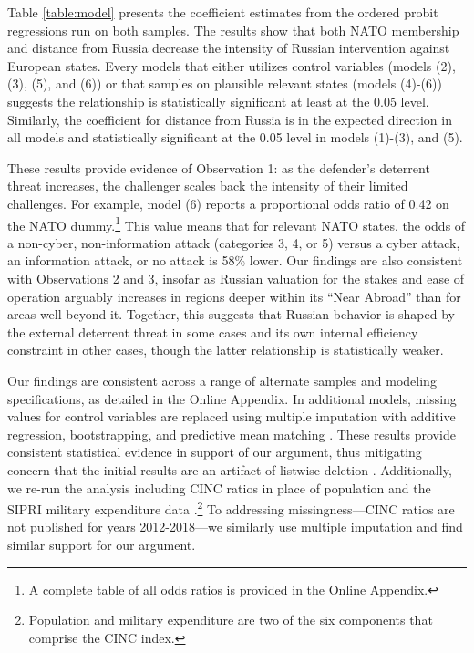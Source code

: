 \documentclass[bibtex, autowc]{apsr_submission}
\begin{document}


Table \ref{table:model} presents the coefficient estimates from the ordered probit regressions run on both samples. The results show that both NATO membership and distance from Russia decrease the intensity of Russian intervention against European states. Every models that either utilizes control variables (models (2), (3), (5), and (6)) or that samples on plausible relevant states (models (4)-(6)) suggests the relationship is statistically significant at least at the 0.05 level. Similarly, the coefficient for distance from Russia is in the expected direction in all models and statistically significant at the 0.05 level in models (1)-(3), and (5).

These results provide evidence of Observation 1: as the defender's deterrent threat increases, the challenger scales back the intensity of their limited challenges. For example, model (6) reports a proportional odds ratio of 0.42 on the NATO dummy.\footnote{A complete table of all odds ratios is provided in the Online Appendix.} This value means that for relevant NATO states, the odds of a non-cyber, non-information attack (categories 3, 4, or 5) versus a cyber attack, an information attack, or no attack is 58\% lower. Our findings are also consistent with Observations 2 and 3, insofar as Russian valuation for the stakes and ease of operation arguably increases in regions deeper within its ``Near Abroad'' than for areas well beyond it. Together, this suggests that Russian behavior is shaped by the external deterrent threat in some cases and its own internal efficiency constraint in other cases, though the latter relationship is statistically weaker.

Our findings are consistent across a range of alternate samples and modeling specifications, as detailed in the Online Appendix. In additional models, missing values for control variables are replaced using multiple imputation with additive regression, bootstrapping, and predictive mean matching \citep{buuren_flexibleimputationmissing_2012}. These results provide consistent statistical evidence in support of our argument, thus mitigating concern that the initial results are an artifact of listwise deletion \citep{lall_howmultipleimputation_2017, arel-bundock_whencanmultiple_2018}. Additionally, we re-run the analysis including CINC ratios in place of population and the SIPRI military expenditure data \citep{singer_capabilitydistributionuncertainty_1972}.\footnote{Population and military expenditure are two of the six components that comprise the CINC index.} To addressing missingness---CINC ratios are not published for years 2012-2018---we similarly use multiple imputation and find similar support for our argument. 
\end{document}
